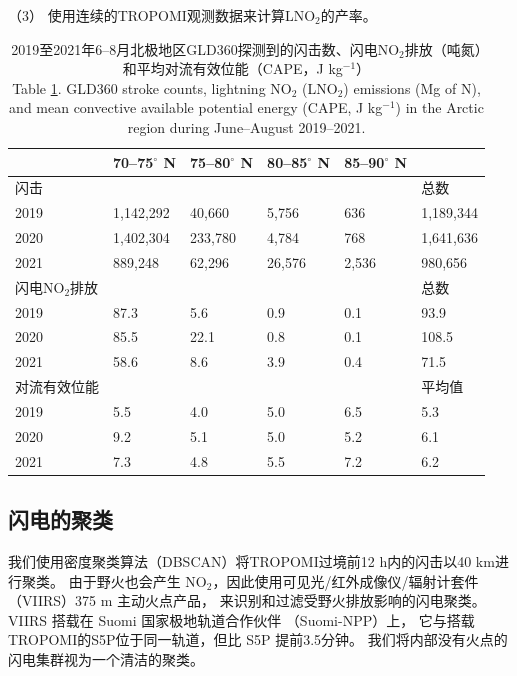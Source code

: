 （3） 使用连续的TROPOMI观测数据来计算LNO$_2$的产率。

\begin{table}[H]
\centering
\caption{2019至2021年6--8月北极地区GLD360探测到的闪击数、闪电NO$_2$排放（吨氮）和平均对流有效位能（CAPE，J kg$^{-1}$）\\
Table \ref{table:arctic_emission}. GLD360 stroke counts, lightning NO$_2$ (LNO$_2$) emissions (Mg of N), and mean
convective available potential energy (CAPE, J kg$^{-1}$) in the Arctic region during June--August 2019--2021.
}
\label{table:arctic_emission}
\footnotesize
\begin{tabular}{llllll}
\hline
{} & 70--75$^{\circ}$ N & 75--80$^{\circ}$ N &
80--85$^{\circ}$ N &  85--90$^{\circ}$ N &  \\
\hline
闪击 & & & & & 总数 \\
\hline
2019 &   1,142,292 &     40,660 &      5,756 &       636  & 1,189,344 \\
2020 &   1,402,304 &    233,780 &      4,784 &       768  &  1,641,636 \\
2021 &     889,248 &     62,296 &     26,576 &      2,536  &  980,656 \\
\hline
闪电NO$_2$排放 & & & & & 总数 \\
\hline
2019 &      87.3 &       5.6 &       0.9 &       0.1 &   93.9 \\
2020 &      85.5 &      22.1 &       0.8 &       0.1 &  108.5 \\
2021 &      58.6 &       8.6 &       3.9 &       0.4 &   71.5 \\
\hline
对流有效位能 & & & & & 平均值 \\
\hline
2019 & 5.5  & 4.0  & 5.0  & 6.5 & 5.3 \\
2020 & 9.2  & 5.1  & 5.0  & 5.2 & 6.1 \\
2021 & 7.3  & 4.8  & 5.5  & 7.2 & 6.2 \\
\hline
\end{tabular}
\end{table}

\subsection*{闪电的聚类}

我们使用密度聚类算法（DBSCAN）将TROPOMI过境前12 h内\citep{Allen.2021a}的闪击以40 km进行聚类\citep{backlund2011density,Schubert.2017}。
由于野火也会产生 NO$_2$，因此使用可见光/红外成像仪/辐射计套件（VIIRS）375 m 主动火点产品，
来识别和过滤受野火排放影响的闪电聚类。
VIIRS 搭载在 Suomi 国家极地轨道合作伙伴 （Suomi-NPP）上，
它与搭载TROPOMI的S5P位于同一轨道，但比 S5P 提前3.5分钟。
我们将内部没有火点的闪电集群视为一个清洁的聚类。

